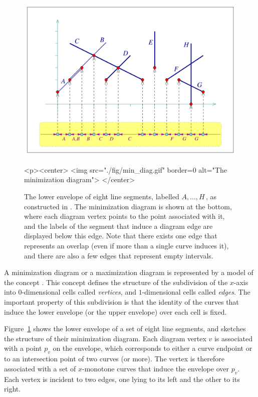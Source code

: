 \begin{figure}[t]
\begin{ccTexOnly}
  \begin{center}
    \includegraphics[width=5in]{Envelope_2/fig/min_diag}
  \end{center}
\end{ccTexOnly}
\begin{ccHtmlOnly}
  <p><center>
  <img src="./fig/min_diag.gif" border=0 alt="The minimization diagram">
  </center>
\end{ccHtmlOnly}
\caption{The lower envelope of eight line segments, labelled
$A, \ldots, H$\,, as constructed in .
The minimization diagram is shown at the bottom, where
each diagram vertex points to the point associated with it, and the
labels of the segment that induce a diagram edge are displayed below
this edge. Note that there exists one edge that represents an overlap
(even if more than a single curve induces it), and there are also a 
few edges that represent empty intervals.\label{env2_fig:min_diag}}
\end{figure}

A minimization diagram or a maximization diagram is represented by
a model of the concept . This concept defines
the structure of the subdivision of the $x$-axis into $0$-dimensional
cells called {\em vertices}, and $1$-dimensional cells called {\em edges}.
The important property of this subdivision is that the identity of
the curves that induce the lower envelope (or the upper envelope)
over each cell is fixed.

Figure~\ref{env2_fig:min_diag} shows the lower envelope of a set of
eight line segments, and sketches the structure of their minimization
diagram. Each diagram vertex $v$ is associated with a point $p_v$ on
the envelope, which corresponds to either a curve endpoint
or to an intersection point of two curves (or more). The vertex is
therefore associated with a set of $x$-monotone curves that induce the
envelope over $p_v$. Each vertex is incident to two edges, one lying
to its left and the other to its right.

